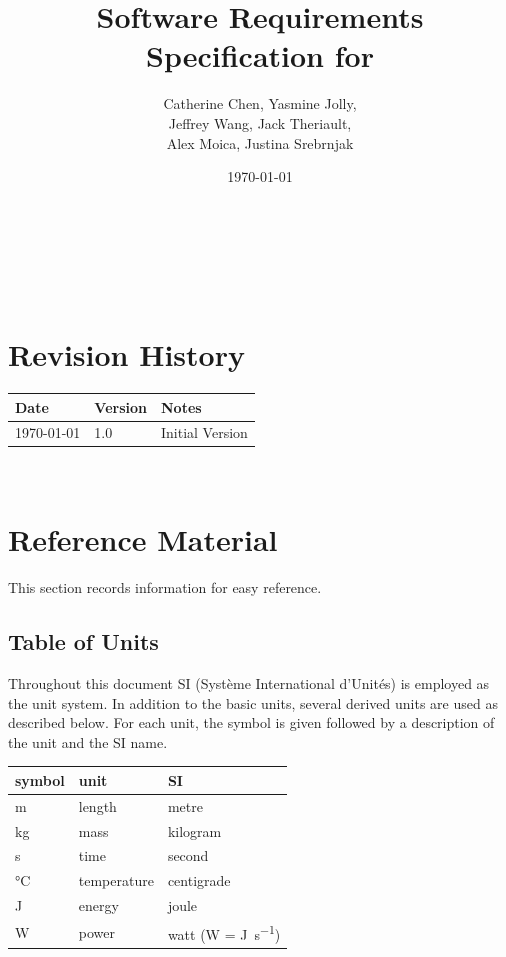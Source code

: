\documentclass[12pt]{article}
\begin{document}
\title{Software Requirements Specification for \progname} 
\author{Catherine Chen, Yasmine Jolly,\\ Jeffrey Wang, Jack Theriault,\\ Alex 
Moica, Justina Srebrnjak}
\date{\today}
	
\maketitle

~\newpage


\tableofcontents

~\newpage

\section*{Revision History}

\begin{tabularx}{\textwidth}{p{3cm}p{2cm}X}
\toprule {\bf Date} & {\bf Version} & {\bf Notes}\\
\midrule
\today & 1.0 & Initial Version\\
\bottomrule
\end{tabularx}

~\newpage

\section{Reference Material}

This section records information for easy reference.

\subsection{Table of Units}

Throughout this document SI (Syst\`{e}me International d'Unit\'{e}s) is employed
as the unit system.  In addition to the basic units, several derived units are
used as described below.  For each unit, the symbol is given followed by a
description of the unit and the SI name.
~\newline

\renewcommand{\arraystretch}{1.2}
  \noindent \begin{tabular}{l l l} 
    \toprule		
    \textbf{symbol} & \textbf{unit} & \textbf{SI}\\
    \midrule 
    \si{\metre} & length & metre\\
    \si{\kilogram} & mass	& kilogram\\
    \si{\second} & time & second\\
    \si{\celsius} & temperature & centigrade\\
    \si{\joule} & energy & joule\\
    \si{\watt} & power & watt (W = \si{\joule\per\second})\\
    \bottomrule
  \end{tabular}
\end{document}
